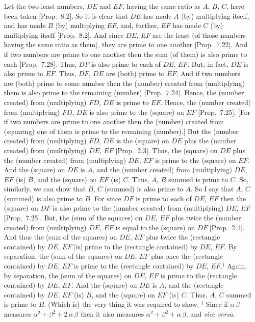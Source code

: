 Let the two least numbers, $DE$ and $EF$, having the same ratio as
$A$, $B$, $C$, have been taken [Prop.~8.2]. So
it is clear that $DE$ has made $A$ (by) multiplying itself, and
has made $B$ (by) multiplying $EF$, and, further, $EF$ has made $C$ (by)
multiplying itself [Prop.~8.2]. And since $DE$, $EF$ are the least (of those numbers having the same ratio as them), 
they are prime to one another [Prop.~7.22]. 
And if two numbers are prime to one another then the sum (of them)
is also prime to each [Prop.~7.28]. Thus, $DF$
is also prime to each of $DE$, $EF$. But, in fact, $DE$ is  also prime to $EF$.
Thus, $DF$, $DE$ are (both) prime to $EF$. And if two numbers are (both)
prime to some number then the (number) created from (multiplying) them
is also prime to the remaining (number) [Prop.~7.24].
Hence, the (number created) from (multiplying) $FD$, $DE$ is prime
to $EF$. Hence, the (number created) from (multiplying) $FD$, $DE$ is also prime
to the (square) on $EF$ [Prop.~7.25]. 
[For if two numbers are prime to one another then the (number) created from
(squaring) one of them is prime to the remaining (number).]
But the (number created) from (multiplying) $FD$, $DE$ is the
(square) on $DE$ plus the (number created) from (multiplying) $DE$, $EF$
[Prop.~2.3]. Thus, the (square) on $DE$ plus
the (number created) from (multiplying) $DE$, $EF$ is prime to the
(square) on $EF$. 
And the (square)
on $DE$ is $A$, and the (number created) from (multiplying) $DE$, $EF$
(is) $B$, and the (square) on $EF$ (is) $C$. Thus,  $A$, $B$ summed is prime to $C$. So,  similarly, we can show that $B$, $C$ (summed) is also
prime to $A$. So I say that $A$, $C$ (summed) is also prime to $B$.
For since $DF$ is prime to each of $DE$, $EF$ then the (square) on
$DF$ is also prime to the (number created) from (multiplying) $DE$, $EF$
[Prop.~7.25]. But, the (sum of the squares) on $DE$, $EF$
plus twice the (number created) from (multiplying) $DE$, $EF$ is equal to
the (square) on $DF$ [Prop.~2.4]. And thus
the (sum of the squares) on $DE$, $EF$ plus twice  the (rectangle contained) by $DE$, $EF$ [is] prime to the (rectangle contained) by $DE$, $EF$.
By separation, the (sum of the squares) on $DE$, $EF$ plus  once the (rectangle contained) by $DE$, $EF$  is prime to the (rectangle contained)  by $DE$, $EF$.$^\dag$ Again, by separation,  the (sum of the squares) on $DE$, $EF$ is prime to the (rectangle contained)  by $DE$, $EF$. And the (square) on $DE$   is $A$,  and the (rectangle contained) by $DE$, $EF$ (is) $B$, and the (square) on $EF$ (is) $C$. Thus, $A$, $C$
summed is prime to $B$. (Which is) the very thing it was required to show.
{\footnotesize\noindent$^\dag$ Since if $\alpha\,\beta$ measures
$\alpha^2+\beta^2+2\,\alpha\,\beta$ then it also measures $\alpha^2+\beta^2+\alpha\,\beta$, and {\em vice versa}.}

